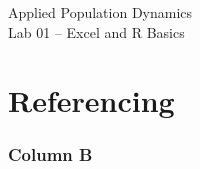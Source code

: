 \documentclass[color=usenames,dvipsnames]{beamer}\usepackage[]{graphicx}\usepackage[]{color}
\begin{document}
\begin{frame}[plain]
  \huge
  \begin{center}
    \huge Applied Population Dynamics \\
    \LARGE Lab 01 -- Excel and R Basics \\
    \vspace{.5cm}
  \end{center}
\end{frame}


\section{Referencing}


\begin{frame}
  \frametitle{Column B}
\end{frame}
\end{document}
